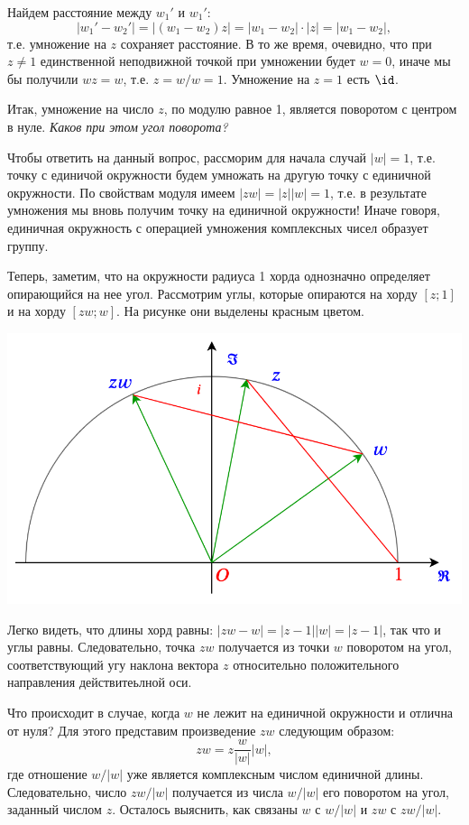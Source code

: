\begin{enumerate}
Найдем расстояние между $w_1'$ и $w_1'$:
$$
|w_1'-w_2'|=|(w_1-w_2)z|=|w_1-w_2|\cdot|z|=|w_1-w_2|,
$$
т.е. умножение на $z$ сохраняет расстояние. В то же время, очевидно, что при $z\ne 1$ единственной неподвижной точкой при умножении будет $w=0$, иначе мы бы получили $wz=w$, т.е. $z=w/w=1$. Умножение на $z=1$ есть $\id$.

Итак, умножение на число $z$, по модулю равное 1, является поворотом с центром в нуле. \textit{Каков при этом угол поворота?} 

Чтобы ответить на данный вопрос, рассморим для начала случай $|w|=1$, т.е. точку с единичой окружности будем умножать на другую точку с единичной окружности. По свойствам модуля имеем $|zw|=|z||w|=1$, т.е. в результате умножения мы вновь получим точку на единичной окружности! Иначе говоря, единичная окружность с операцией умножения комплексных чисел образует группу.

Теперь, заметим, что на окружности радиуса 1 хорда однозначно определяет опирающийся на нее угол. Рассмотрим углы, которые опираются на хорду $[z;1]$ и на хорду $[zw;w]$. На рисунке они выделены красным цветом.
\begin{center}
\includegraphics[scale=0.4]{complex-ring.png}
\end{center}

Легко видеть, что длины хорд равны: $|zw-w|=|z-1||w|=|z-1|$, так что и углы равны. Следовательно, точка $zw$ получается из точки $w$ поворотом на угол, соответствующий угу наклона вектора $z$ относительно положительного направления действитеьлной оси.

Что происходит в случае, когда $w$ не лежит на единичной окружности и отлична от нуля? Для этого представим произведение $zw$ следующим образом:
$$
zw = z\frac{w}{|w|}|w|,
$$
где отношение $w/|w|$ уже является комплексным числом единичной длины. Следовательно, число $zw/|w|$ получается из числа $w/|w|$ его поворотом на угол, заданный числом $z$. Осталось выяснить, как связаны $w$ с $w/|w|$ и $zw$ с $zw/|w|$.


\end{enumerate}
